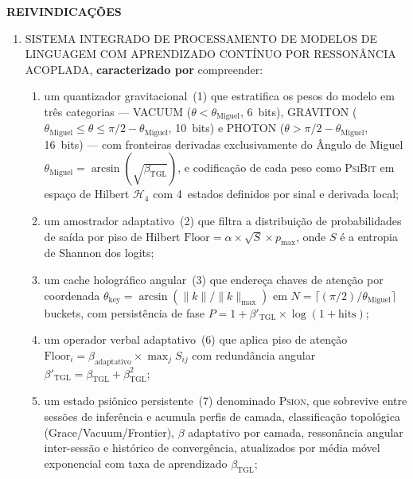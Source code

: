 \documentclass[12pt,a4paper]{article}
\newcommand{\betatgl}{\beta_{\text{TGL}}}
\newcommand{\betared}{\beta'_{\text{TGL}}}
\newcommand{\thetaM}{\theta_{\text{Miguel}}}
\newcommand{\Hfour}{\mathcal{H}_4}
\newcommand{\PsiBit}{\textsc{PsiBit}}
\newcommand{\Psion}{\textsc{Psion}}
\begin{document}
\clearpage
\begin{center}
{\Large\bfseries REIVINDICAÇÕES}
\end{center}

\begin{enumerate}[label=\textbf{\arabic*.}, leftmargin=*, itemsep=0.8em]

\item SISTEMA INTEGRADO DE PROCESSAMENTO DE MODELOS DE LINGUAGEM COM APRENDIZADO CONTÍNUO POR RESSONÂNCIA ACOPLADA, \textbf{caracterizado por} compreender:
\begin{enumerate}[label=(\alph*)]
\item um quantizador gravitacional~(1) que estratifica os pesos do modelo em três categorias --- VACUUM ($\theta < \thetaM$, 6~bits), GRAVITON ($\thetaM \leq \theta \leq \pi/2 - \thetaM$, 10~bits) e PHOTON ($\theta > \pi/2 - \thetaM$, 16~bits) --- com fronteiras derivadas exclusivamente do Ângulo de Miguel $\thetaM = \arcsin(\sqrt{\betatgl})$, e codificação de cada peso como \PsiBit{} em espaço de Hilbert $\Hfour$ com 4~estados definidos por sinal e derivada local;

\item um amostrador adaptativo~(2) que filtra a distribuição de probabilidades de saída por piso de Hilbert $\text{Floor} = \alpha \times \sqrt{S} \times p_{\max}$, onde $S$ é a entropia de Shannon dos logits;

\item um cache holográfico angular~(3) que endereça chaves de atenção por coordenada $\theta_{\text{key}} = \arcsin(\|k\|/\|k\|_{\max})$ em $N = \lceil(\pi/2)/\thetaM\rceil$ buckets, com persistência de fase $P = 1 + \betared \times \log(1 + \text{hits})$;

\item um operador verbal adaptativo~(6) que aplica piso de atenção $\text{Floor}_i = \beta_{\text{adaptativo}} \times \max_j S_{ij}$ com redundância angular $\betared = \betatgl + \betatgl^2$;

\item um estado psiônico persistente~(7) denominado \Psion, que sobrevive entre sessões de inferência e acumula perfis de camada, classificação topológica (Grace/Vacuum/Frontier), $\beta$ adaptativo por camada, ressonância angular inter-sessão e histórico de convergência, atualizados por média móvel exponencial com taxa de aprendizado $\betatgl$;


\end{enumerate}
\end{enumerate}
\end{document}
